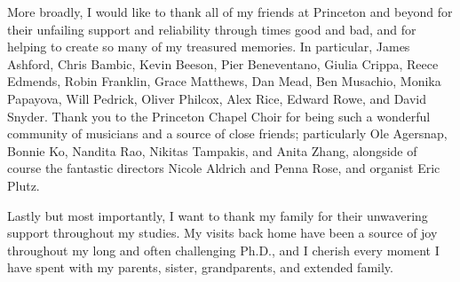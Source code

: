 More broadly, I would like to thank all of my friends at Princeton and beyond
for their unfailing support and reliability through times good and bad, and for
helping to create so many of my treasured memories. In particular, James
Ashford, Chris Bambic, Kevin Beeson, Pier Beneventano, Giulia Crippa, Reece
Edmends, Robin Franklin, Grace Matthews, Dan Mead, Ben Musachio, Monika
Papayova, Will Pedrick, Oliver Philcox, Alex Rice, Edward Rowe, and David
Snyder. Thank you to the Princeton Chapel Choir for being such a wonderful
community of musicians and a source of close friends; particularly Ole
Agersnap, Bonnie Ko, Nandita Rao, Nikitas Tampakis, and Anita Zhang, alongside
of course the fantastic directors Nicole Aldrich and Penna Rose, and organist
Eric Plutz.

Lastly but most importantly, I want to thank my family for their unwavering
support throughout my studies. My visits back home have been a source of joy
throughout my long and often challenging Ph.D., and I cherish every moment I
have spent with my parents, sister, grandparents, and extended family.
